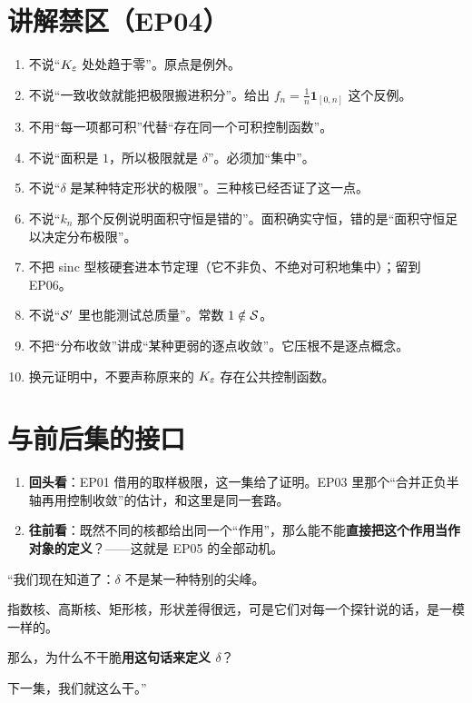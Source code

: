 \section{讲解禁区（EP04）}

\begin{warnbox}[逐条对照]
\begin{enumerate}[leftmargin=1.6em,itemsep=0.28em]
\item 不说“$K_\varepsilon$ 处处趋于零”。原点是例外。
\item 不说“一致收敛就能把极限搬进积分”。给出 $f_n=\frac1n\mathbf{1}_{[0,n]}$ 这个反例。
\item 不用“每一项都可积”代替“存在同一个可积控制函数”。
\item 不说“面积是 $1$，所以极限就是 $\delta$”。必须加“集中”。
\item 不说“$\delta$ 是某种特定形状的极限”。三种核已经否证了这一点。
\item 不说“$k_n$ 那个反例说明面积守恒是错的”。面积确实守恒，错的是“面积守恒足以决定分布极限”。
\item 不把 sinc 型核硬套进本节定理（它不非负、不绝对可积地集中）；留到 EP06。
\item 不说“$\mathcal{S}'$ 里也能测试总质量”。常数 $1\notin\mathcal{S}$。
\item 不把“分布收敛”讲成“某种更弱的逐点收敛”。它压根不是逐点概念。
\item 换元证明中，不要声称原来的 $K_\varepsilon$ 存在公共控制函数。
\end{enumerate}
\end{warnbox}

\section{与前后集的接口}

\begin{enumerate}[leftmargin=2em,itemsep=0.45em]
\item \textbf{回头看}：EP01 借用的取样极限，这一集给了证明。EP03 里那个“合并正负半轴再用控制收敛”的估计，和这里是同一套路。
\item \textbf{往前看}：既然不同的核都给出同一个“作用”，那么能不能\textbf{直接把这个作用当作对象的定义}？——这就是 EP05 的全部动机。
\end{enumerate}

\begin{scriptbox}[最后 30 秒的旁白骨架]
“我们现在知道了：$\delta$ 不是某一种特别的尖峰。

指数核、高斯核、矩形核，形状差得很远，可是它们对每一个探针说的话，是一模一样的。

那么，为什么不干脆\textbf{用这句话来定义 $\delta$}？

下一集，我们就这么干。”
\end{scriptbox}


